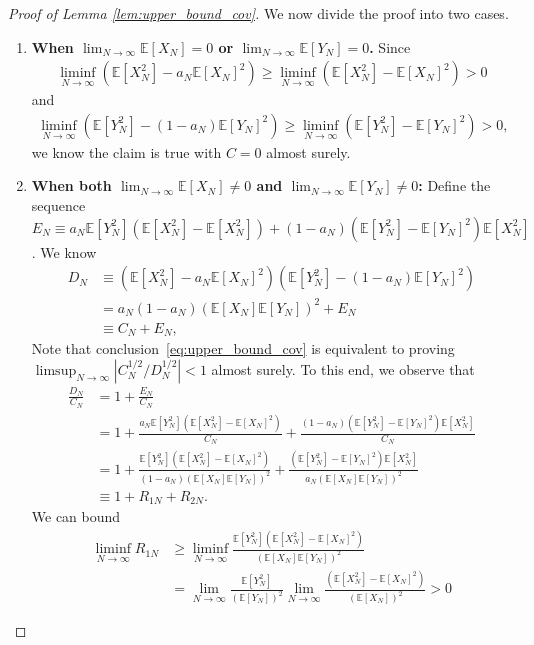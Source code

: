\documentclass[12pt]{article}
\newcommand{\E}{\mathbb E}								%
\begin{document}
\begin{proof}[Proof of Lemma \ref{lem:upper_bound_cov}]

	We now divide the proof into two cases.
	\begin{enumerate}
		\item \textbf{When $\lim_{N\rightarrow\infty}\E[X_N]=0$ or $\lim_{N\rightarrow\infty}\E[Y_N]=0$.} Since 
	\begin{align*}
		\liminf_{N\rightarrow\infty}(\E[X_N^2]-a_N\E[X_N]^2)\geq \liminf_{N\rightarrow\infty}(\E[X_N^2]-\E[X_N]^2)>0
	\end{align*}
	and 
	\begin{align*}
		\liminf_{N\rightarrow\infty}(\E[Y_N^2]-(1-a_N)\E[Y_N]^2)\geq \liminf_{N\rightarrow\infty}(\E[Y_N^2]-\E[Y_N]^2)>0,
	\end{align*}
	we know the claim is true with $C=0$ almost surely.
	\item\textbf{When both $\lim_{N\rightarrow\infty}\E[X_N]\neq 0$ and $\lim_{N\rightarrow\infty}\E[Y_N]\neq 0$:} Define the sequence $E_N\equiv a_N\E[Y_N^2](\E[X_N^2]-\E[X_N^2]) +(1-a_N)(\E[Y_N^2]-\E[Y_N]^2)\E[X_N^2]$. We know 
	\begin{align*}
		D_N 
		&
		\equiv (\E[X_N^2]-a_N\E[X_N]^2)(\E[Y_N^2]-(1-a_N)\E[Y_N]^2)\\
		&
		= a_N(1-a_N)(\E[X_N]\E[Y_N])^2+ E_N\\
		&
		\equiv C_N +E_N,
	\end{align*}
	Note that conclusion~\eqref{eq:upper_bound_cov} is equivalent to proving $\limsup_{N\rightarrow\infty}|C_N^{1/2}/D_N^{1/2}|<1$ almost surely. To this end, we observe that
	\begin{align*}
		\frac{D_N}{C_N}
		&
		=1+\frac{E_N}{C_N}\\
		&
		=1+\frac{a_N\E[Y_N^2](\E[X_N^2]-\E[X_N]^2)}{C_N}+\frac{(1-a_N)(\E[Y_N^2]-\E[Y_N]^2)\E[X_N^2]}{C_N}\\
		&
		=1+\frac{\E[Y_N^2](\E[X_N^2]-\E[X_N]^2)}{(1-a_N)(\E[X_N]\E[Y_N])^2}+\frac{(\E[Y_N^2]-\E[Y_N]^2)\E[X_N^2]}{a_N (\E[X_N]\E[Y_N])^2}\\
		&
		\equiv 1+R_{1N}+R_{2N}.
	\end{align*}
	We can bound 
	\begin{align*}
		\liminf_{N\rightarrow\infty}R_{1N}
		&
		\geq \liminf_{N\rightarrow\infty}\frac{\E[Y_N^2](\E[X_N^2]-\E[X_N]^2)}{(\E[X_N]\E[Y_N])^2}\\
		&
		=\lim_{N\rightarrow\infty}\frac{\E[Y_N^2]}{(\E[Y_N])^2}\lim_{N\rightarrow\infty}\frac{(\E[X_N^2]-\E[X_N]^2)}{(\E[X_N])^2}>0
	\end{align*}

\end{enumerate}
\end{proof}
\end{document}
